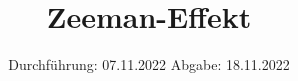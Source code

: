 

\subject{Versuch Nr.V27}
\title{Zeeman-Effekt}
\date{%
  Durchführung: 07.11.2022
  \hspace{3em}
  Abgabe: 18.11.2022
}



\maketitle
\thispagestyle{empty}
\tableofcontents
\newpage 








\nocite{*}

\printbibliography{}


